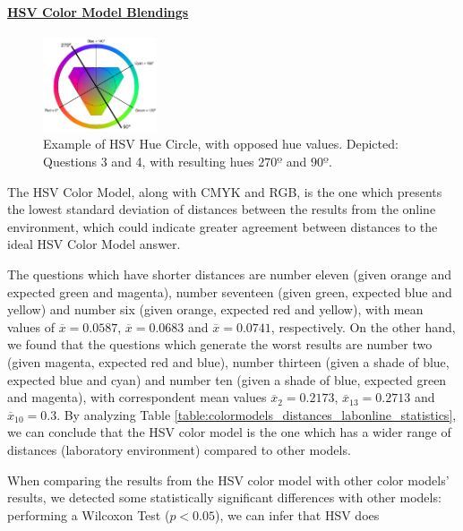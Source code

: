 \paragraph{\ul{HSV Color Model Blendings}} \par
\label{par:hsvcolormodel}
%
\begin{figure}
	\centering
    \vspace{-\baselineskip}
	  \includegraphics[width=0.3\textwidth]{images/results/HSV_hue.png}
    \caption[Example of HSV Hue Circle, with opposed hue values.]{Example of HSV Hue Circle, with opposed hue values. Depicted: Questions 3 and 4, with resulting hues $270º$ and $90º$.}
    \label{fig:hsvcircles_example}
\end{figure}
%
The HSV Color Model, along with CMYK and RGB, is the one which presents the lowest standard deviation of distances between the results from the online environment, which could indicate greater agreement between distances
 to the ideal HSV Color Model answer. \par
%
The questions which have shorter distances are number eleven (given orange and expected green and magenta), number seventeen (given green, expected blue and yellow) and number six (given orange,
expected red and yellow), with mean values of $\overline{x} = 0.0587$, $\overline{x} = 0.0683$ and $\overline{x} = 0.0741$, respectively.
On the other hand, we found that the questions which generate the worst results are number two (given magenta, expected red and blue), number thirteen (given a shade of blue, expected blue and cyan) and number
ten (given a shade of blue, expected green and magenta), with correspondent mean values $\overline{x}_{2} = 0.2173$, $\overline{x}_{13} = 0.2713$ and
$\overline{x}_{10} = 0.3$.
By analyzing Table \ref{table:colormodels_distances_labonline_statistics}, we can conclude that the HSV color model is the one which has a wider range of distances (laboratory environment) compared to other models. \par
%
When comparing the results from the HSV color model with other color models' results, we detected some statistically significant differences with other models: performing a Wilcoxon Test ($p < 0.05$), we can infer that HSV does
